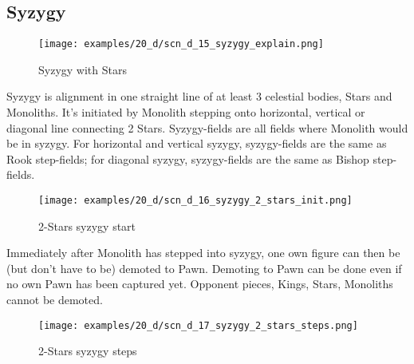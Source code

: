 \subsection*{Syzygy}

\vspace*{-1.2\baselineskip}
\noindent
\begin{figure}[!h]
\texttt{[image: examples/20\_d/scn\_d\_15\_syzygy\_explain.png]}
\caption{Syzygy with Stars}
\label{fig:scn_d_15_syzygy_explain}
\end{figure}

Syzygy is alignment in one straight line of at least 3 celestial bodies, Stars and Monoliths. It's initiated by
Monolith stepping onto horizontal, vertical or diagonal line connecting 2 Stars. Syzygy-fields are all fields
where Monolith would be in syzygy. For horizontal and vertical syzygy, syzygy-fields are the same as Rook
step-fields; for diagonal syzygy, syzygy-fields are the same as Bishop step-fields.

\clearpage %

\noindent
\begin{figure}[!h]
\texttt{[image: examples/20\_d/scn\_d\_16\_syzygy\_2\_stars\_init.png]}
\caption{2-Stars syzygy start}
\label{fig:scn_d_16_syzygy_2_stars_init}
\end{figure}

Immediately after Monolith has stepped into syzygy, one own figure can then be (but don't have to be) demoted to
Pawn. Demoting to Pawn can be done even if no own Pawn has been captured yet. Opponent pieces, Kings, Stars,
Monoliths cannot be demoted.

\clearpage %

\noindent
\begin{figure}[!h]
\texttt{[image: examples/20\_d/scn\_d\_17\_syzygy\_2\_stars\_steps.png]}
\caption{2-Stars syzygy steps}
\label{fig:scn_d_17_syzygy_2_stars_steps}
\end{figure}

